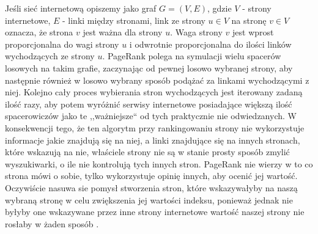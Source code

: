 Jeśli sieć internetową opiszemy jako graf $G = (V, E)$, gdzie $V$ - strony internetowe, $E$ - linki między stronami, link ze strony $u \in V$ na stronę $v \in V$ oznacza, że strona $v$ jest ważna dla strony $u$. Waga strony $v$ jest wprost proporcjonalna do wagi strony $u$ i odwrotnie proporcjonalna do ilości linków wychodzących ze strony $u$. PageRank polega na symulacji wielu spacerów losowych na takim grafie, zaczynając od pewnej losowo wybranej strony, aby następnie również w losowo wybrany sposób podążać za linkami wychodzącymi z niej. Kolejno cały proces wybierania stron wychodzących jest iterowany zadaną ilość razy, aby potem wyróżnić serwisy internetowe posiadające większą ilość spacerowiczów jako te ,,ważniejsze`` od tych praktycznie nie odwiedzanych. W konsekwencji tego, że ten algorytm przy rankingowaniu strony nie wykorzystuje informacje jakie znajdują się na niej, a linki znajdujące się na innych stronach, które wskazują na nie, właściele strony nie są w stanie prosty sposób zmylić wyszukiwarki, o ile nie kontrolują tych innych stron. PageRank nie wierzy w to co strona mówi o sobie, tylko wykorzystuje opinię innych, aby ocenić jej wartość. Oczywiście nasuwa sie pomysł stworzenia stron, które wskazywałyby na naszą wybraną stronę w celu zwiększenia jej wartości indeksu, ponieważ jednak nie byłyby one wskazywane przez inne strony internetowe wartość naszej strony nie rosłaby w żaden sposób \cite{MiningofMassiveDatasets}.


